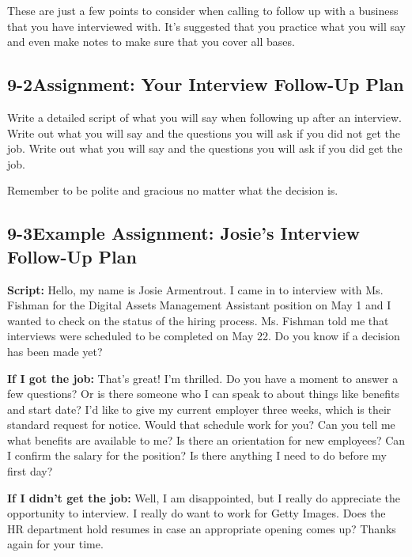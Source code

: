 These are just a few points to consider when calling to follow up with a business that you have interviewed with. It's suggested that you practice what you will say and even make notes to make sure that you cover all bases.

\pagebreak \subsection*{9-2\quad Assignment: Your Interview Follow-Up Plan}
Write a detailed script of what you will say when following up after an interview. Write out what you will say and the questions you will ask if you did not get the job. Write out what you will say and the questions you will ask if you did get the job.

Remember to be polite and gracious no matter what the decision is.

\pagebreak \subsection*{9-3\quad Example Assignment: Josie's Interview Follow-Up Plan}
\textbf{Script:}
\break Hello, my name is Josie Armentrout. I came in to interview with Ms. Fishman for the Digital Assets Management Assistant position on May 1 and I wanted to check on the status of the hiring process. Ms. Fishman told me that interviews were scheduled to be completed on May 22. Do you know if a decision has been made yet?

\textbf{If I got the job:}
\break That's great! I'm thrilled.
\break Do you have a moment to answer a few questions? Or is there someone who I can speak to about things like benefits and start date?
\break I'd like to give my current employer three weeks, which is their standard request for notice. Would that schedule work for you?
\break Can you tell me what benefits are available to me? Is there an orientation for new employees?
\break Can I confirm the salary for the position?
\break Is there anything I need to do before my first day?

\textbf{If I didn't get the job:}
\break Well, I am disappointed, but I really do appreciate the opportunity to interview. I really do want to work for Getty Images. Does the HR department hold resumes in case an appropriate opening comes up?
\break Thanks again for your time.
 
